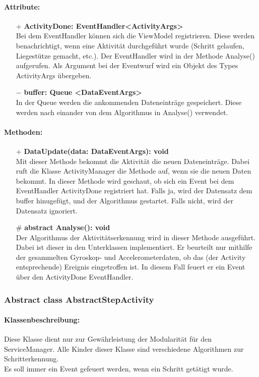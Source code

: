 \documentclass[a4paper,12pt]{article}
\begin{document}
	\paragraph{Attribute:}
	\begin{itemize}
		\item[+] \textbf{ActivityDone: EventHandler<ActivityArgs>}\\Bei dem EventHandler können sich die ViewModel registrieren. Diese werden benachrichtigt, wenn eine Aktivität durchgeführt wurde (Schritt gelaufen, Liegestütze gemacht, etc.). Der EventHandler wird in der Methode Analyse() aufgerufen. Als Argument bei der Eventwurf wird ein Objekt des Types ActivityArgs übergeben.
		\item [$-$] \textbf{buffer: Queue <DataEventArgs>}\\In der Queue werden die ankommenden Dateneinträge gespeichert. Diese werden nach einander von dem Algorithmus in Analyse() verwendet. 
	\end{itemize}
	\paragraph{Methoden:}
	\begin{itemize}
		\item[+] \textbf{DataUpdate(data: DataEventArgs): void}\\Mit dieser Methode bekommt die Aktivität die neuen Dateneinträge. Dabei ruft die Klasse ActivityManager die Methode auf, wenn sie die neuen Daten bekommt. In dieser Methode wird geschaut, ob sich ein Event bei dem EventHandler ActivityDone registriert hat. Falls ja, wird der Datensatz dem buffer hinugefügt, und der Algorithmus gestartet. Falls nicht, wird der Datensatz ignoriert.
		\item[\#] \textbf{abstract Analyse(): void}\\Der Algorithmus der Aktivitätserkennung wird in dieser Methode ausgeführt. Dabei ist dieser in den Unterklassen implementiert. Er beurteilt nur mithilfe der gesammelten Gyroskop- und Accelerometerdaten, ob das (der Activity entsprechende) Ereignis eingetroffen ist. In diesem Fall feuert er ein Event über den ActivityDone EventHandler. 
	\end{itemize}
	\subsubsection{Abstract class AbstractStepActivity}
	\paragraph{Klassenbeschreibung:}
	Diese Klasse dient nur zur Gewährleistung der Modularität für den ServiceManager. Alle Kinder dieser Klasse sind verschiedene Algorithmen zur Schritterkennung.\\ Es soll immer ein Event gefeuert werden, wenn ein Schritt getätigt wurde.
\end{document}
